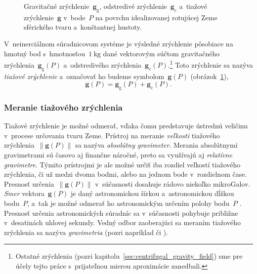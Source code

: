 \documentclass[a4paper, 12pt]{book}
\newcommand{\gidx}{\mathrm g}
\newcommand{\cidx}{\mathrm c}
\let\vec\mathbf
\begin{document}
\begin{figure}
\centering

\caption{Gravitačné zrýchlenie~$\vec g_\gidx$, odstredivé zrýchlenie~$\vec 
g_\cidx$ a~tiažové zrýchlenie~$\vec g$ v~bode~$P$ na povrchu idealizovanej 
rotujúcej Zeme sférického tvaru a~konštantnej hustoty.}
\label{fig:gravity_vector}
\end{figure}

V~neinerciálnom súradnicovom systéme je výsledné zrýchlenie pôsobiace na hmotný 
bod s~hmotnosťou~$1 \ \mathrm{kg}$ dané vektorovým súčtom gravitačného 
zrýchlenia~$\vec g_\gidx(P)$ a~odstredivého zrýchlenia~$\vec 
g_\cidx(P)$.\footnote{Ostatné zrýchlenia (pozri 
kapitolu~\ref{sec:centrifugal_gravity_field}) sme pre účely tejto práce 
s~prijateľnou mierou aproximácie zanedbali.}  Toto zrýchlenie sa nazýva 
\emph{tiažové zrýchlenie} a~označovať ho budeme symbolom~$\vec g(P)$ 
(obrázok~\ref{fig:gravity_vector}),
%
\begin{equation}
\label{eq:g}
\vec g(P) = \vec g_\gidx(P) + \vec g_\cidx(P){.}
\end{equation}


\subsubsection{Meranie tiažového zrýchlenia}
\label{sec:gravity_measurements}

Tiažové zrýchlenie je možné odmerať, vďaka čomu predstavuje ústrednú veličinu 
v~procese určovania tvaru Zeme.  Prístroj na meranie \emph{veľkosti} tiažového 
zrýchlenia~$\| \vec g(P) \|$ sa nazýva \emph{absolútny gravimeter}.  Merania 
absolútnymi gravimetrami sú časovo aj finančne náročné, preto sa využívajú aj 
\emph{relatívne gravimetre}.  Týmito prístrojmi je ale možné určiť iba rozdiel 
veľkostí tiažového zrýchlenia, či už medzi dvoma bodmi, alebo na jednom bode 
v~rozdielnom čase.  Presnosť určenia~$\| \vec g(P) \|$ v~súčasnosti dosahuje 
rádovo niekoľko mikroGalov.  \emph{Smer} vektora~$\vec g(P)$ je daný 
astronomickou šírkou a~astronomickou dĺžkou bodu~$P$, a~tak je možné odmerať ho 
astronomickým určením polohy bodu~$P$ \parencite{MoritzPhysicalGeodesy}.  
Presnosť určenia astronomických súradníc sa v~súčasnosti pohybuje približne 
v~desatinách uhlovej sekundy.    Vedný odbor zaoberajúci sa meraním tiažového 
zrýchlenia sa nazýva \emph{gravimetria} (pozri napríklad 
\cite{Torge1989,Rozimant1994} či \cite{Janak2010}).  
\end{document}
